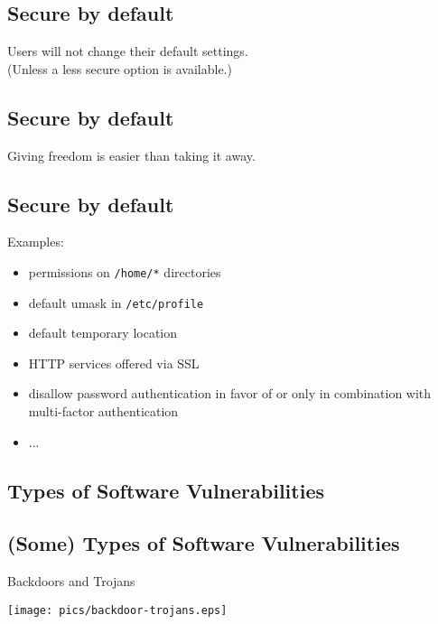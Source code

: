 \documentclass[xga]{xdvislides}
\begin{document}
\subsection{Secure by default}
\vspace{.5in}
\Huge
\begin{center}
Users will not change their default settings. \\
\Normalsize
(Unless a less secure option is available.)
\end{center}

\subsection{Secure by default}
\vspace{.5in}
\Huge
\begin{center}
Giving freedom is easier than taking it away. \\
\end{center}
\Normalsize

\subsection{Secure by default}
Examples:
\begin{itemize}
	\item permissions on \verb+/home/*+ directories
	\item default umask in \verb+/etc/profile+
	\item default temporary location
	\item HTTP services offered via SSL
	\item disallow password authentication in favor of or only in
		combination with multi-factor authentication
	\item ...
\end{itemize}


\subsection{Types of Software Vulnerabilities}

\subsection{(Some) Types of Software Vulnerabilities}
Backdoors and Trojans
\begin{center}
	\texttt{[image: pics/backdoor-trojans.eps]}
\end{center}
\end{document}
